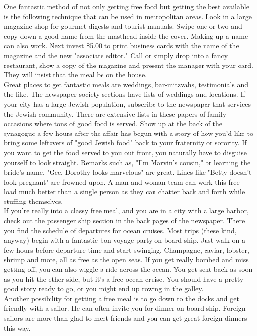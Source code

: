 \documentclass[11pt,twoside,a4paper]{book}
\begin{document}
One fantastic method of not only getting free food but getting the best available is the following technique that can be used in metropolitan areas. Look in a large magazine shop for gourmet digests and tourist manuals. Swipe one or two and copy down a good name from the masthead inside the cover. Making up a name can also work. Next invest \$5.00 to print business cards with the name of the magazine and the new "associate editor." Call or simply drop into a fancy restaurant, show a copy of the magazine and present the manager with your card. They will insist that the meal be on the house.~\\

Great places to get fantastic meals are weddings, bar-mitzvahs, testimonials and the like. The newspaper society sections have lists of weddings and locations. If your city has a large Jewish population, subscribe to the newspaper that services the Jewish community. There are extensive lists in these papers of family occasions where tons of good food is served. Show up at the back of the synagogue a few hours after the affair has begun with a story of how you'd like to bring some leftovers of "good Jewish food" back to your fraternity or sorority. If you want to get the food served to you out front, you naturally have to disguise yourself to look straight. Remarks such as, "I'm Marvin's cousin," or learning the bride's name, "Gee, Dorothy looks marvelous" are great. Lines like "Betty doesn't look pregnant" are frowned upon. A man and woman team can work this free-load much better than a single person as they can chatter back and forth while stuffing themselves.~\\

If you're really into a classy free meal, and you are in a city with a large harbor, check out the passenger ship section in the back pages of the newspaper. There you find the schedule of departures for ocean cruises. Most trips (these kind, anyway) begin with a fantastic bon voyage party on board ship. Just walk on a few hours before departure time and start swinging. Champagne, caviar, lobster, shrimp and more, all as free as the open seas. If you get really bombed and miss getting off, you can also wiggle a ride across the ocean. You get sent back as soon as you hit the other side, but it's a free ocean cruise. You should have a pretty good story ready to go, or you might end up rowing in the galley.~\\

Another possibility for getting a free meal is to go down to the docks and get friendly with a sailor. He can often invite you for dinner on board ship. Foreign sailors are more than glad to meet friends and you can get great foreign dinners this way.~\\ 
\end{document}

